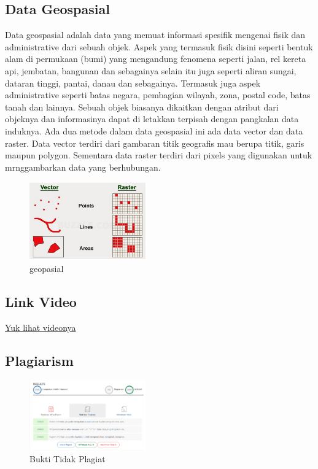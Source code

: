 \subsection{Data Geospasial}
Data geospasial adalah data yang memuat informasi spesifik mengenai fisik dan administrative dari sebuah objek. Aspek yang termasuk fisik disini seperti bentuk alam di permukaan (bumi) yang mengandung fenomena seperti jalan, rel kereta api, jembatan, bangunan dan sebagainya selain itu juga seperti aliran sungai, dataran tinggi, pantai, danau dan sebagainya. Termasuk juga aspek administrative seperti batas negara, pembagian wilayah, zona, postal code, batas tanah dan lainnya. Sebuah objek biasanya dikaitkan dengan atribut dari objeknya dan informasinya dapat di letakkan terpisah dengan pangkalan data induknya. Ada dua metode dalam data geospasial ini ada data vector dan data raster. Data vector terdiri dari gambaran titik geografis mau berupa titik, garis maupun polygon. Sementara data raster terdiri dari pixels yang digunakan untuk mrnggambarkan data yang berhubungan. 
\begin{figure}[H]
	\includegraphics[width=5cm]{figures/1174009/t3.png}
	\centering
	\caption{geopasial}
\end{figure}

\subsection{Link Video}
\href{https://youtu.be/MXutHP_22_M}{Yuk lihat videonya}

\subsection{Plagiarism}
\begin{figure}[H]
	\includegraphics[width=5cm]{figures/1174009/plagiat1.png}
	\centering
	\caption{Bukti Tidak Plagiat}
\end{figure}

